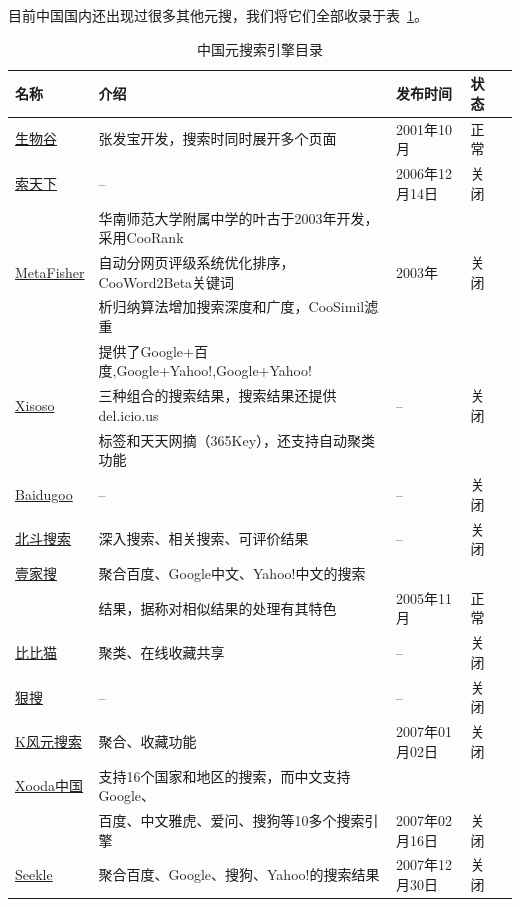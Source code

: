目前中国国内还出现过很多其他元搜，我们将它们全部收录于表~\ref{tbl:cnmetase}。
\begin{table}[htbp]
\centering
\caption{中国元搜索引擎目录}\label{tbl:cnmetase}
\begin{tabular}{|l|l|l|l|l|}
    \hline\hline
    名称 & 介绍 & 发布时间 & 状态\\
    \hline
    \href{http://www.bioon.com/multisearch.htm/}{生物谷} &  张发宝开发，搜索时同时展开多个页面 & 2001年10月 & 正常\\
    \hline
    \href{http://www.suotianxia.com}{索天下} &  -- & 2006年12月14日 & 关闭\\
    \hline
        &  华南师范大学附属中学的叶古于2003年开发，采用CooRank & & \\
    \href{http://coo.hsfz.net/fish/}{MetaFisher} & 自动分网页评级系统优化排序，CooWord2Beta关键词 & 2003年 & 关闭\\
        & 析归纳算法增加搜索深度和广度，CooSimil滤重 & & \\
     \hline
        & 提供了Google+百度,Google+Yahoo!,Google+Yahoo! & & \\
    \href{http://www.xisoso.com/}{Xisoso} &  三种组合的搜索结果，搜索结果还提供del.icio.us  & -- & 关闭 \\
        & 标签和天天网摘（365Key），还支持自动聚类功能 & & \\
    \hline
    \href{http://www.baidugoo.com/}{Baidugoo} &  -- & -- & 关闭\\
    \hline
    \href{http://www.bydou.com/}{北斗搜索} &  深入搜索、相关搜索、可评价结果 & -- & 关闭 \\
    \hline
    \href{http://www.ejear.com/}{壹家搜} &  聚合百度、Google中文、Yahoo!中文的搜索 & & \\
        & 结果，据称对相似结果的处理有其特色 & 2005年11月 & 正常\\
    \hline
    \href{http://www.bbmao.com/}{比比猫} &  聚类、在线收藏共享 & -- & 关闭\\
    \hline
    \href{http://www.hensou.com/}{狠搜} &  -- & -- & 关闭\\
    \hline
    \href{http://www.kwindsoft.com/k-metasearch/}{K风元搜索} &  聚合、收藏功能 & 2007年01月02日 & 关闭\\
    \hline
    \href{http://cn.xooda.com/}{Xooda中国} &  支持16个国家和地区的搜索，而中文支持Google、&&\\
        & 百度、中文雅虎、爱问、搜狗等10多个搜索引擎 & 2007年02月16日 & 关闭\\
    \hline
    \href{http://www.seekle.cn/}{Seekle} &  聚合百度、Google、搜狗、Yahoo!的搜索结果 & 2007年12月30日 & 关闭\\

\end{tabular}
\end{table}
